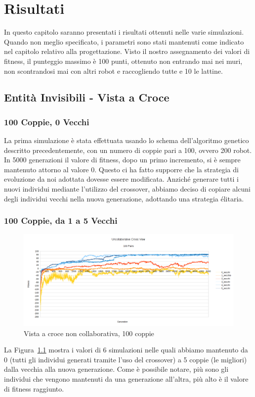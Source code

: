 \chapter{Risultati}
In questo capitolo saranno presentati i risultati ottenuti nelle varie
simulazioni. Quando non meglio specificato, i parametri sono stati mantenuti
come indicato nel capitolo relativo alla progettazione.\newline
Visto il nostro assegnamento dei valori di fitness, il punteggio massimo è 100
punti, ottenuto non entrando mai nei muri, non scontrandosi mai con altri robot
e raccogliendo tutte e 10 le lattine.



\section{Entità Invisibili - Vista a Croce}

\subsection{100 Coppie, 0 Vecchi}
La prima simulazione è stata effettuata usando lo schema dell'algoritmo genetico
descritto precedentemente, con un numero di coppie pari a 100, ovvero 200 robot.
In 5000 generazioni il valore di fitness, dopo un primo incremento, si è sempre
mantenuto attorno al valore 0. Questo ci ha fatto supporre che la strategia di
evoluzione da noi adottata dovesse essere modificata. Anziché generare tutti i
nuovi individui mediante l'utilizzo del crossover, abbiamo deciso di copiare
alcuni degli individui vecchi nella nuova generazione, adottando una strategia
élitaria.

\subsection{100 Coppie, da 1 a 5 Vecchi}
\begin{figure}[ht]
	\centering
	\includegraphics[scale=0.7,angle=90]{imgs/uncollaborative_cross_100_pairs_0_5_vecchi.png}
	\caption{Vista a croce non collaborativa, 100 coppie}
	\label{figure:uncoll_cross_100_0_5}
\end{figure}
La Figura~\ref{figure:uncoll_cross_100_0_5} mostra i valori di 6 simulazioni
nelle quali abbiamo mantenuto da 0 (tutti gli individui generati tramite l'uso
del crossover) a 5 coppie (le migliori) dalla vecchia alla nuova generazione.
Come è possibile notare, più sono gli individui che vengono mantenuti da una
generazione all'altra, più alto è il valore di fitness raggiunto.

